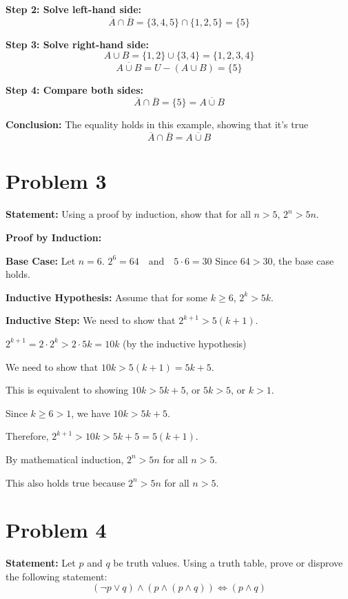 \documentclass{article}
\begin{document}
\textbf{Step 2: Solve left-hand side:}  
\[
\overline{A} \cap \overline{B} = \{3,4,5\} \cap \{1,2,5\} = \{5\}
\]

\textbf{Step 3: Solve right-hand side:}  
\[
A \cup B = \{1,2\} \cup \{3,4\} = \{1,2,3,4\}
\]  
\[
\overline{A \cup B} = U - (A \cup B) = \{5\}
\]

\textbf{Step 4: Compare both sides:}  
\[
\overline{A} \cap \overline{B} = \{5\} = \overline{A \cup B}
\]

\textbf{Conclusion:} The equality holds in this example, showing that it's true
\[
\overline{A} \cap \overline{B} = \overline{A \cup B}
\] 

\section*{Problem 3}

\textbf{Statement:} Using a proof by induction, show that for all $n > 5$, $2^n > 5n$.


\textbf{Proof by Induction:}

\textbf{Base Case:} Let $n = 6$.
$2^6 = 64 \quad \text{and} \quad 5 \cdot 6 = 30$
Since $64 > 30$, the base case holds.

\textbf{Inductive Hypothesis:} Assume that for some $k \geq 6$, $2^k > 5k$.

\textbf{Inductive Step:} We need to show that $2^{k+1} > 5(k+1)$.

$2^{k+1} = 2 \cdot 2^k > 2 \cdot 5k = 10k$
(by the inductive hypothesis)

We need to show that $10k > 5(k+1) = 5k + 5$.

This is equivalent to showing $10k > 5k + 5$, or $5k > 5$, or $k > 1$.

Since $k \geq 6 > 1$, we have $10k > 5k + 5$.

Therefore, $2^{k+1} > 10k > 5k + 5 = 5(k+1)$.


By mathematical induction, $2^n > 5n$ for all $n > 5$.

This also holds true because $2^n > 5n$ for all $n > 5$.

\section*{Problem 4}

\textbf{Statement:} Let $p$ and $q$ be truth values. Using a truth table, prove or disprove the following statement:
$$(\neg p \vee q) \wedge (p \wedge (p \wedge q)) \Leftrightarrow (p \wedge q)$$
\end{document}
